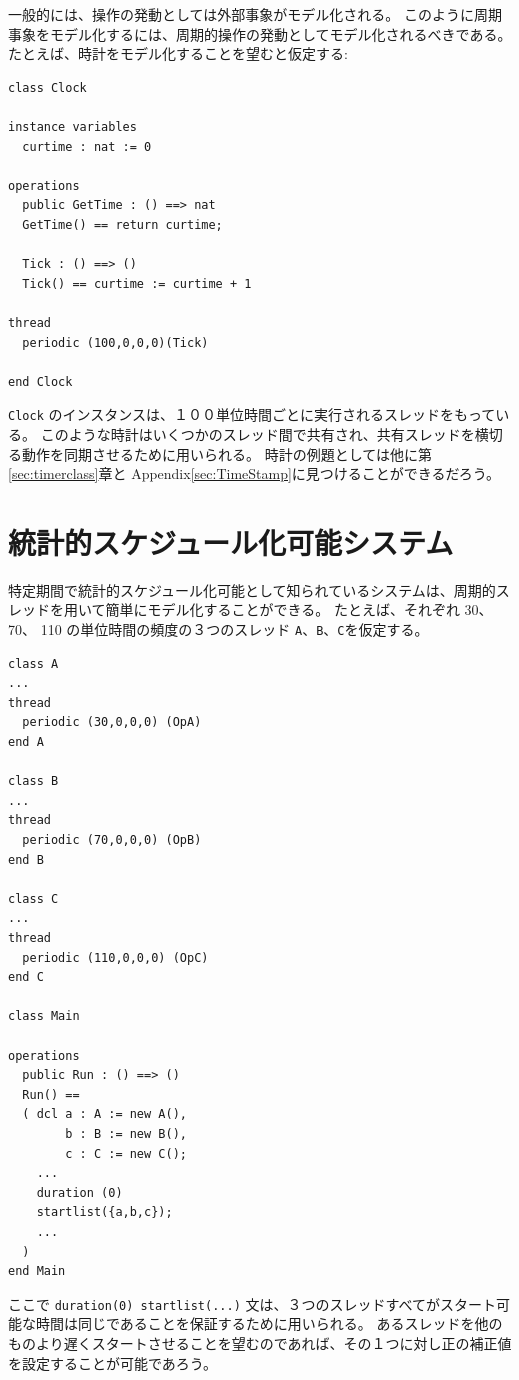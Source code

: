 \documentclass[\pformat,12pt]{jreport}
\begin{document}
一般的には、操作の発動としては外部事象がモデル化される。
このように周期事象をモデル化するには、周期的操作の発動としてモデル化されるべきである。
たとえば、時計をモデル化することを望むと仮定する:

\begin{lstlisting}
class Clock

instance variables
  curtime : nat := 0

operations
  public GetTime : () ==> nat
  GetTime() == return curtime;

  Tick : () ==> ()
  Tick() == curtime := curtime + 1

thread
  periodic (100,0,0,0)(Tick)

end Clock
\end{lstlisting}

 \texttt{Clock} のインスタンスは、１００単位時間ごとに実行されるスレッドをもっている。
このような時計はいくつかのスレッド間で共有され、共有スレッドを横切る動作を同期させるために用いられる。
時計の例題としては他に第\ref{sec:timerclass}章と Appendix\ref{sec:TimeStamp}に見つけることができるだろう。

\section{統計的スケジュール化可能システム}

特定期間で統計的スケジュール化可能として知られているシステムは、周期的スレッドを用いて簡単にモデル化することができる。
たとえば、それぞれ 30、 70、 110 の単位時間の頻度の３つのスレッド \texttt{A}、\texttt{B}、\texttt{C}を仮定する。

\begin{lstlisting}
class A
...
thread
  periodic (30,0,0,0) (OpA)
end A

class B
...
thread
  periodic (70,0,0,0) (OpB)
end B

class C
...
thread
  periodic (110,0,0,0) (OpC)
end C

class Main

operations
  public Run : () ==> ()
  Run() ==
  ( dcl a : A := new A(),
        b : B := new B(),
        c : C := new C();
    ...
    duration (0)
    startlist({a,b,c});
    ...
  )
end Main
\end{lstlisting}

ここで \texttt{duration(0) startlist(...)} 文は、３つのスレッドすべてがスタート可能な時間は同じであることを保証するために用いられる。
あるスレッドを他のものより遅くスタートさせることを望むのであれば、その１つに対し正の補正値を設定することが可能であろう。
\end{document}
